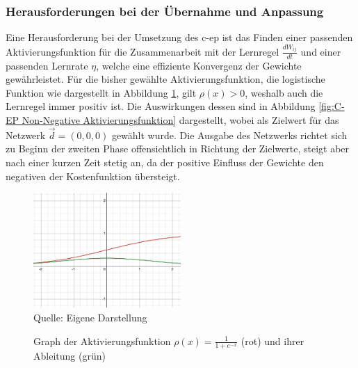 \subsubsection{Herausforderungen bei der Übernahme und Anpassung}
\label{chap:Herausforderungen bei der Übernahme und Anpassung}

Eine Herausforderung bei der Umsetzung des \ac{c-ep} ist das Finden einer passenden Aktivierungsfunktion für die Zusammenarbeit mit der Lernregel \(\frac{dW_{ij}}{dt}\) und einer passenden Lernrate \(\eta\), welche eine effiziente Konvergenz der Gewichte gewährleistet. Für die bisher gewählte Aktivierungsfunktion, die logistische Funktion wie dargestellt in Abbildung \ref{fig:Graph der Aktivierungsfunktion}, gilt \(\rho(x) > 0\), weshalb auch die Lernregel immer positiv ist. Die Auswirkungen dessen sind in Abbildung \ref{fig:C-EP Non-Negative Aktivierungsfunktion} dargestellt, wobei als Zielwert für das Netzwerk \(\vec{d}=(0,0,0)\) gewählt wurde. Die Ausgabe des Netzwerks richtet sich zu Beginn der zweiten Phase offensichtlich in Richtung der Zielwerte, steigt aber nach einer kurzen Zeit stetig an, da der positive Einfluss der Gewichte den negativen der Kostenfunktion übersteigt.

\begin{figure}[h]
  \caption{Graph der Aktivierungsfunktion \(\rho(x)=\frac{1}{1+e^{-x}}\) (rot) und ihrer Ableitung (grün)}
  \includegraphics[width=0.5\textwidth]{abbildungen/sigmoid_funktion.png}
  \\
  Quelle: Eigene Darstellung
  \label{fig:Graph der Aktivierungsfunktion}
\end{figure}

